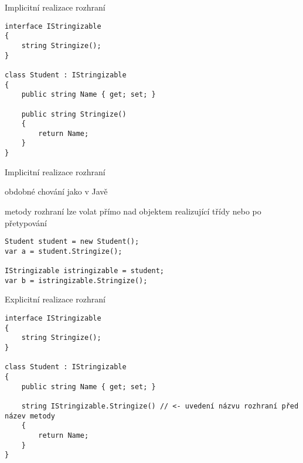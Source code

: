 \begin{frame}[fragile]
\vfill
\begin{block}{}
Implicitní realizace rozhraní
\end{block}
\vfill
\begin{yesblock}
\begin{lstlisting}[basicstyle=\small]
interface IStringizable
{
    string Stringize();
}

class Student : IStringizable
{
    public string Name { get; set; }

    public string Stringize()
    {
        return Name;
    }
}
\end{lstlisting}
\end{yesblock}
\vfill
\end{frame}


\begin{frame}[fragile]
\vfill
\begin{bitemize}{Implicitní realizace rozhraní}
\item obdobné chování jako v Javě
\item metody rozhraní lze volat přímo nad objektem realizující třídy nebo po přetypování
\end{bitemize}
\vfill
\begin{yesblock}
\begin{lstlisting}[basicstyle=\small]
Student student = new Student();
var a = student.Stringize();

IStringizable istringizable = student;
var b = istringizable.Stringize();
\end{lstlisting}
\end{yesblock}
\vfill
\end{frame}







\begin{frame}[fragile]
\vfill
\begin{block}{}
Explicitní realizace rozhraní
\end{block}
\vfill
\begin{yesblock}
\begin{lstlisting}[basicstyle=\small]
interface IStringizable
{
    string Stringize();
}

class Student : IStringizable
{
    public string Name { get; set; }

    string IStringizable.Stringize() // <- uvedení názvu rozhraní před název metody
    {
        return Name;
    }
}
\end{lstlisting}
\end{yesblock}
\vfill
\end{frame}


